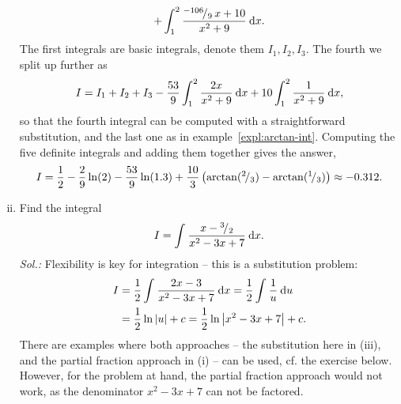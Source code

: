 \begin{example}
\begin{enumerate}[(i)]
\begin{equation*}
\begin{split}
								+\int_{1}^{2} \frac{{}^{-106}\!/_{9}\,x+10}{x^2+9} \: \mathrm{d} x.
	\end{split}
	\end{equation*}
	The first integrals are basic integrals, denote them $I_1,I_2,I_3$. The fourth we split up further as
	\[ I = I_1 + I_2 + I_3 
		-\frac{53}{9}\int_{1}^{2} \frac{2x}{x^2+9} \: \mathrm{d} x
		+10\int_{1}^{2} \frac{1}{x^2+9} \: \mathrm{d} x, \]
	so that the fourth integral can be computed with a straightforward substitution, and the last one as in example~\ref{expl:arctan-int}. Computing the five definite integrals and adding them together gives the answer,
	\[ I = \frac12 -\frac29\ln(2)-\frac{53}{9}\ln(1.3)
		+\frac{10}{3}\left(\arctan ({}^{2}\!/_{3}) - \arctan({}^{1}\!/_{3}) \right)
		\approx -0.312. \]
	\item Find the integral
	\[ I = \int_{}^{} \frac{x-{}^{3}\!/_{2}}{x^2-3x+7} \: \mathrm{d} x. \]
	{\it Sol.:}
	Flexibility is key for integration -- this is a substitution problem:
	\begin{equation*}
	\begin{split}
	I & = \frac12 \int_{}^{} \frac{2x-3}{x^2-3x+7} \: \mathrm{d} x
	= \frac12 \int_{}^{} \frac1u \: \mathrm{d} u \\
	& = \frac12 \ln \left| u \right| + c
	= \frac12 \ln \left| x^2-3x+7 \right| + c.
	\end{split}
	\end{equation*}
	There are examples where both approaches -- the substitution here in (iii), and the partial fraction approach in (i) -- can be used, cf. the exercise below. However, for the problem at hand, the partial fraction approach would not work, as the denominator $x^2-3x+7$ can not be factored.
\end{enumerate}
\end{example}

